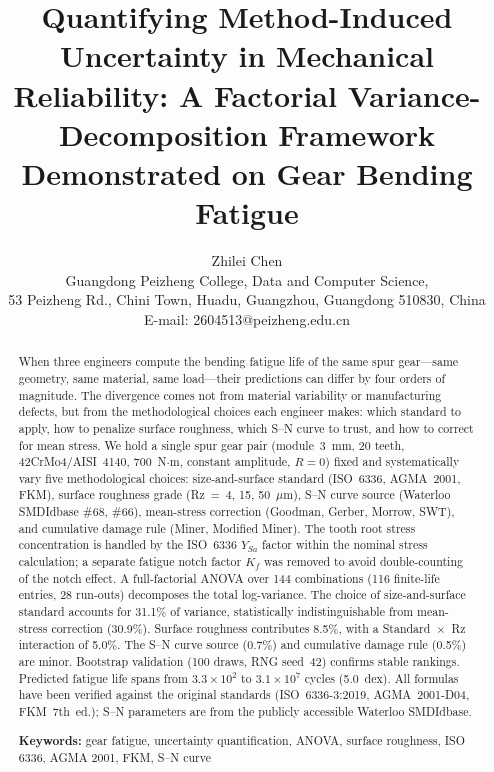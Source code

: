 \documentclass[12pt,a4paper]{article}
\begin{document}
\title{\textbf{Quantifying Method-Induced Uncertainty in Mechanical\\
Reliability: A Factorial Variance-Decomposition Framework\\
Demonstrated on Gear Bending Fatigue}}

\author{Zhilei Chen\\
Guangdong Peizheng College, Data and Computer Science,\\
53 Peizheng Rd., Chini Town, Huadu, Guangzhou, Guangdong 510830, China\\
E-mail: 2604513@peizheng.edu.cn}

\maketitle

\begin{abstract}
\label{sec:abstract}

When three engineers compute the bending fatigue life of the same spur
gear---same geometry, same material, same load---their predictions can
differ by four orders of magnitude. The divergence comes not from
material variability or manufacturing defects, but from the
methodological choices each engineer makes: which standard to apply, how
to penalize surface roughness, which S--N curve to trust, and how to
correct for mean stress. We hold a single spur gear pair
(module~3~mm, 20 teeth, 42CrMo4/AISI~4140, 700~N$\cdot$m, constant
amplitude, $R=0$) fixed and systematically vary five methodological
choices: size-and-surface standard (ISO~6336, AGMA~2001, FKM), surface
roughness grade (Rz~=~4, 15, 50~$\mu$m), S--N curve source (Waterloo
SMDIdbase \#68, \#66), mean-stress correction (Goodman, Gerber, Morrow,
SWT), and cumulative damage rule (Miner, Modified Miner). The tooth
root stress concentration is handled by the ISO~6336 $Y_{Sa}$ factor
within the nominal stress calculation; a separate fatigue notch factor
$K_f$ was removed to avoid double-counting of the notch effect. A
full-factorial ANOVA over 144 combinations (116 finite-life entries,
28 run-outs) decomposes the total log-variance. The choice of
size-and-surface standard accounts for 31.1\% of variance, statistically
indistinguishable from mean-stress correction (30.9\%). Surface
roughness contributes 8.5\%, with a Standard~$\times$~Rz interaction of
5.0\%. The S--N curve source (0.7\%) and cumulative damage rule (0.5\%)
are minor. Bootstrap validation (100 draws, RNG seed~42) confirms
stable rankings. Predicted fatigue life spans from $3.3\times10^2$ to
$3.1\times10^7$ cycles (5.0~dex). All formulas have been verified
against the original standards (ISO~6336-3:2019, AGMA~2001-D04,
FKM~7th~ed.); S--N parameters are from the publicly accessible Waterloo
SMDIdbase.

\textbf{Keywords:} gear fatigue, uncertainty quantification, ANOVA,
surface roughness, ISO 6336, AGMA 2001, FKM, S--N curve
\end{abstract}
\end{document}
